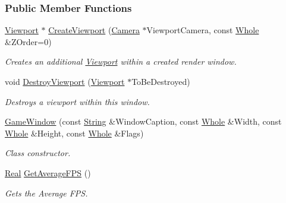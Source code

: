 \subsubsection*{Public Member Functions}
\begin{DoxyCompactItemize}
\item 
\hyperlink{classMezzanine_1_1Viewport}{Viewport} $\ast$ \hyperlink{classMezzanine_1_1GameWindow_a9a5c31130d7d2970d1c0141173bcdce3}{CreateViewport} (\hyperlink{classMezzanine_1_1Camera}{Camera} $\ast$ViewportCamera, const \hyperlink{namespaceMezzanine_adcbb6ce6d1eb4379d109e51171e2e493}{Whole} \&ZOrder=0)
\begin{DoxyCompactList}\small\item\em Creates an additional \hyperlink{classMezzanine_1_1Viewport}{Viewport} within a created render window. \item\end{DoxyCompactList}\item 
void \hyperlink{classMezzanine_1_1GameWindow_a810561a4b96667bf88be137722d44407}{DestroyViewport} (\hyperlink{classMezzanine_1_1Viewport}{Viewport} $\ast$ToBeDestroyed)
\begin{DoxyCompactList}\small\item\em Destroys a viewport within this window. \item\end{DoxyCompactList}\item 
\hyperlink{classMezzanine_1_1GameWindow_aebf4352707c9c1a7d8ca8d1f2a562ccd}{GameWindow} (const \hyperlink{namespaceMezzanine_acf9fcc130e6ebf08e3d8491aebcf1c86}{String} \&WindowCaption, const \hyperlink{namespaceMezzanine_adcbb6ce6d1eb4379d109e51171e2e493}{Whole} \&Width, const \hyperlink{namespaceMezzanine_adcbb6ce6d1eb4379d109e51171e2e493}{Whole} \&Height, const \hyperlink{namespaceMezzanine_adcbb6ce6d1eb4379d109e51171e2e493}{Whole} \&Flags)
\begin{DoxyCompactList}\small\item\em Class constructor. \item\end{DoxyCompactList}\item 
\hyperlink{namespaceMezzanine_a726731b1a7df72bf3583e4a97282c6f6}{Real} \hyperlink{classMezzanine_1_1GameWindow_ad6dcba20b92b4881a35a872ba36037d5}{GetAverageFPS} ()
\begin{DoxyCompactList}\small\item\em Gets the Average FPS. \item\end{DoxyCompactList}\item 

\end{DoxyCompactItemize}
